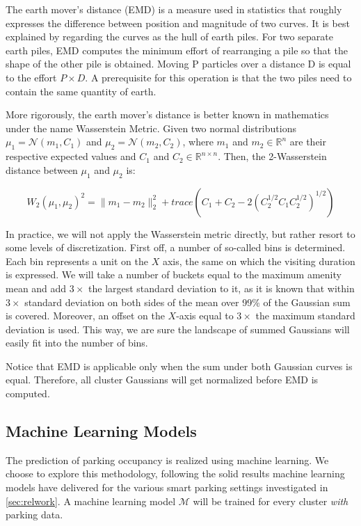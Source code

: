 The earth mover's distance (EMD) is a measure used in statistics that roughly expresses the difference between position and magnitude of two curves.
It is best explained by regarding the curves as the hull of earth piles.
For two separate earth piles, EMD computes the minimum effort of rearranging a pile so that the shape of the other pile is obtained.
Moving P particles over a distance D is equal to the effort $P \times D$.
A prerequisite for this operation is that the two piles need to contain the same quantity of earth.

More rigorously, the earth mover's distance is better known in mathematics under the name Wasserstein Metric.
Given two normal distributions $\mu_1=\mathcal{N}(m_1,C_1)$ and $\mu_2=\mathcal{N}(m_2,C_2)$, where $m_1$ and $m_2 \in \mathbb{R}^{n}$ are their respective expected values and $C_1$ and $C_2 \in \mathbb{R}^{n\times n}$.
Then, the 2-Wasserstein distance between $\mu_1$ and $\mu_2$ is:

\begin{equation}
W_2(\mu_1,\mu_2)^2={\lVert}m_1-m_2{\rVert}^2_2+trace(C_1+C_2-2(C_2^{1/2}C_1C_2^{1/2})^{1/2})
\end{equation}

In practice, we will not apply the Wasserstein metric directly, but rather resort to some levels of discretization.
First off, a number of so-called bins is determined.
Each bin represents a unit on the $X$ axis, the same on which the visiting duration is expressed.
We will take a number of buckets equal to the maximum amenity mean and add $3\times$ the largest standard deviation to it, as it is known that within $3\times$ standard deviation on both sides of the mean over 99\% of the Gaussian sum is covered.
Moreover, an offset on the $X$-axis equal to $3\times$ the maximum standard deviation is used.
This way, we are sure the landscape of summed Gaussians will easily fit into the number of bins.

Notice that EMD is applicable only when the sum under both Gaussian curves is equal.
Therefore, all cluster Gaussians will get normalized before EMD is computed.

\subsection{Machine Learning Models}
\label{realization:machine_learning_models}
The prediction of parking occupancy is realized using machine learning.
We choose to explore this methodology, following the solid results machine learning models have delivered for the various smart parking settings investigated in \ref{sec:relwork}. A machine learning model $\mathcal{M}$ will be trained for every cluster \textit{with} parking data.

